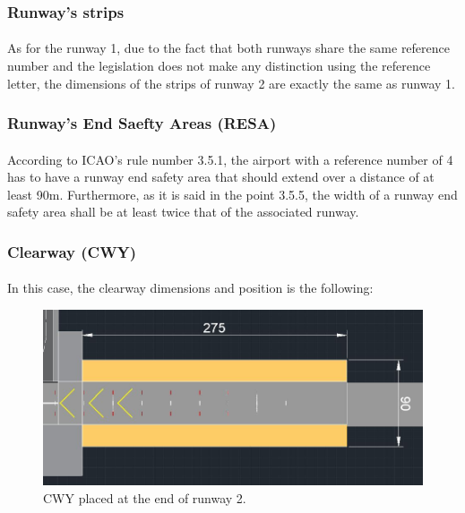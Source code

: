 	
		\subsubsection{Runway's strips}
		\paragraph{}As for the runway 1, due to the fact that both runways share the same reference number and the legislation does not make any distinction using the reference letter, the dimensions of the strips of runway 2 are exactly the same as runway 1. 
		
		\subsubsection{Runway's End Saefty Areas (RESA)}
		\paragraph{}According to ICAO's rule number 3.5.1, the airport with a 	reference number of 4 has to have a runway end safety area that should extend over a distance of at least 90m. Furthermore, as it is said in the point 3.5.5, the width of a runway end safety area shall be at least twice that of the associated runway. 
	
		\subsubsection{Clearway (CWY)}
		\paragraph{}In this case, the clearway dimensions and position is the following:
	
		\begin{figure}[H]
			\centering
			\includegraphics[clip, trim=0cm 0cm 0cm 0cm, width=1\textwidth]{./images/declareddistances/CWY2}
			\caption{CWY placed at the end of runway 2.} %
			\label{} %
		\end{figure}
		

